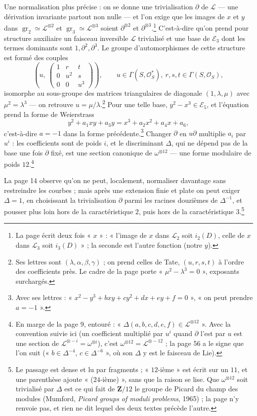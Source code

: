 \documentclass[11pt,a4paper]{article}
\begin{document}
Une normalisation plus précise : on se donne une trivialisation $\partial$ de
$\mathcal{L}$ --- une dérivation invariante partout non nulle --- et l'on exige
que les images de $x$ et $y$ dans $\operatorname{gr}_2 \simeq
\mathcal{L}^{\otimes 2}$ et $\operatorname{gr}_3 \simeq \mathcal{L}^{\otimes 3}$
soient $\partial^{\otimes 2}$ et $\partial^{\otimes 3}$.\footnote{La page écrit
deux fois « $x$ » : « l'image de $x$ dans $\mathcal{L}_2$ soit $i_2(D)$, celle
de $x$ dans $\mathcal{L}_3$ soit $i_3(D)$ » ; la seconde est l'autre fonction
(notre $y$).} C'est-à-dire qu'on prend pour structure auxiliaire un faisceau
inversible $\mathcal{L}$ trivialisé et une base de $\mathcal{E}_3$ dont les
termes dominants sont $1, \partial^2, \partial^3$. Le groupe d'automorphismes
de cette structure est formé des couples
\[
\left(u,\ \begin{pmatrix} 1 & r & t \\ 0 & u^2 & s \\ 0 & 0 & u^3 \end{pmatrix}\right),
\qquad u \in \Gamma(S, \mathcal{O}_S^*),\ r, s, t \in \Gamma(S, \mathcal{O}_S),
\]
isomorphe au sous-groupe des matrices triangulaires de diagonale $(1, \lambda,
\mu)$ avec $\mu^2 = \lambda^3$ --- on retrouve $u = \mu/\lambda$.\footnote{Ses
lettres sont $(\lambda, \alpha, \beta, \gamma)$ ; on prend celles de Tate, $(u,
r, s, t)$ à l'ordre des coefficients près. Le cadre de la page porte
« $\mu^2 - \lambda^3 = 0$ », exposants surchargés.} Pour une telle base, $y^2 -
x^3 \in \mathcal{E}_5$, et l'équation prend la forme de Weierstrass
\[
y^2 + a_1xy + a_3y = x^3 + a_2x^2 + a_4x + a_6,
\]
c'est-à-dire $a = -1$ dans la forme précédente.\footnote{Avec ses lettres :
« $x^2 - y^3 + bxy + cy^2 + dx + ey + f = 0$ », « on peut prendre $a = -1$ ».}
Changer $\partial$ en $u\partial$ multiplie $a_i$ par $u^i$ : les coefficients
sont de poids $i$, et le discriminant $\Delta$, qui ne dépend pas de la base
une fois $\partial$ fixé, est une section canonique de $\omega^{\otimes 12}$ ---
une forme modulaire de poids $12$.\footnote{En marge de la page 9, entouré :
« $\Delta(a, b, c, d, e, f) \in \mathcal{L}^{\otimes 12}$ ». Avec la convention
suivie ici (un coefficient multiplié par $u^i$ quand $\partial$ l'est par $u$
est une section de $\mathcal{L}^{\otimes -i} = \omega^{\otimes i}$), c'est
$\omega^{\otimes 12} = \mathcal{L}^{\otimes -12}$ ; la page 56 a le signe que
l'on suit (« $b \in \Delta^{-4}$, $c \in \Delta^{-6}$ », où son $\Delta$ y est
le faisceau de Lie).}

La page 14 observe qu'on ne peut, localement, normaliser davantage sans
restreindre les courbes ; mais après une extension finie et plate on peut
exiger $\Delta = 1$, en choisissant la trivialisation $\partial$ parmi les
racines douzièmes de $\Delta^{-1}$, et pousser plus loin hors de la
caractéristique $2$, puis hors de la caractéristique $3$.\footnote{Le passage
est dense et lu par fragments ; « $12$-ième » est écrit sur un $11$, et une
parenthèse ajoute « ($24$-ième) », sans que la raison se lise. Que
$\omega^{\otimes 12}$ soit trivialisé par $\Delta$ est ce qui fait de
$\mathbf{Z}/12$ le groupe de Picard du champ des modules (Mumford,
\emph{Picard groups of moduli problems}, 1965) ; la page n'y renvoie pas, et
rien ne dit lequel des deux textes précède l'autre.}
\end{document}
